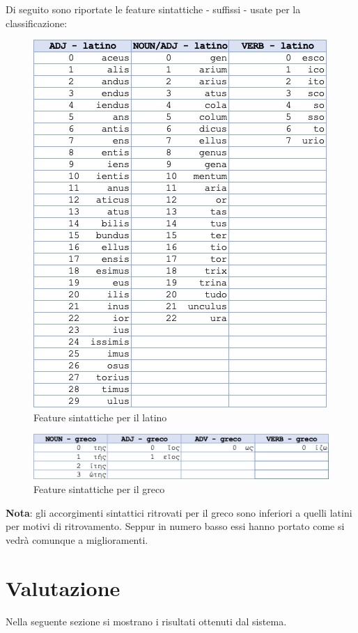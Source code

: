 \documentclass[12pt]{article}
\begin{document}
Di seguito sono riportate le feature sintattiche - suffissi - usate per la classificazione:
\begin{figure}[H]
   \centering
   \includegraphics[scale=0.5]{fig/SintassiLatino.png}
   \caption{Feature sintattiche per il latino}\label{fig:sntxLatino}
\end{figure}

\begin{figure}[H]
   \centering
   \includegraphics[scale=0.5]{fig/SintassiGreco.png}
   \caption{Feature sintattiche per il greco}\label{fig:sntxGreco}
\end{figure}

\textbf{Nota}: gli accorgimenti sintattici ritrovati per il greco sono inferiori a quelli latini per motivi di ritrovamento. Seppur in numero basso essi hanno portato come si vedrà comunque a miglioramenti.
\section{Valutazione}
Nella seguente sezione si mostrano i risultati ottenuti dal sistema.
\end{document}
